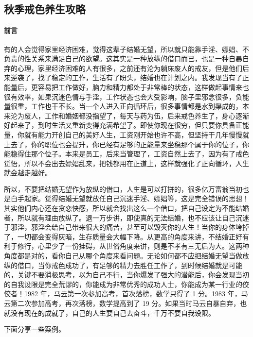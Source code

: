 \subsection{秋季戒色养生攻略}

\paragraph{前言}

有的人会觉得家里经济困难，觉得这辈子结婚无望，所以就只能靠手淫、嫖娼、不负责的性关系来满足自己的欲望。这其实是一种放纵的借口而已，也是一种自暴自弃的心理，家里经济困难的人有很多，之前还有沦为躺床废人的戒友，但是他们后来逆袭了，找了稳定的工作，生活有了盼头，结婚也在计划之内。我发现当有了正能量后，更容易把工作做好，脑力和精力都处于非常棒的状态，这样做起事情来也很有效率，如果沉迷色情与手淫，工作状态也会大受影响，脑子里邪念很多，负能量很重，工作也干不长。当一个人进入正向循环后，很多事情都是水到渠成的，本来沦为废人，工作和婚姻都没指望了，每天与药为伍，后来戒色养生了，身心逐渐好起来了，到时生活又重新变得充满希望了。即使你现在很穷，但只要你具备正能量，你就有能力开创自己的美好人生，工资刚开始也许不高，但坚持干几年慢慢就上去了，你的职位也会提升，你已经有足够的正能量来坐稳那个属于你的位子，你能稳得住那个位子。本来是员工，后来当管理了，工资自然上去了，因为有了戒色觉悟，所以不会出去嫖娼乱来，把钱都用在正道上，这样就强化了正向循环，人生就会越走越好。

所以，不要把结婚无望作为放纵的借口，人生是可以打拼的，很多亿万富翁当初也是白手起家。觉得结婚无望就放任自己沉迷手淫、嫖娼等，这是完全错误的思想！其实他们内心还在贪恋快感，所以就会找出这么一个借口，把自己设定为不能结婚者，所以就有理由放纵了。退一万步讲，即使真的无法结婚，也不应该让自己沉迷于邪淫，邪淫会给自己带来很大的痛苦，甚至可以毁灭你的人生！当你的身体垮掉了，一切都会变得灰暗，生存质量会大幅下降。从更高的角度来讲，不结婚正好有利于修行，心里少了一份挂碍，从世俗角度来讲，则是不孝有三无后为大。这两种角度都是对的，看你自己从哪个角度来看问题。无论如何都不应把结婚无望当做放纵的借口，当你戒色成功了，有足够的精力去胜任工作了，到时候结婚就是可能的，关键不要消极思考，以为自己不行，当你爆发了强大的潜能后，你会发现当初的自我设限是完全荒谬的，你能成为非常优秀的成功人士，你能成为某一行业的佼佼者！1982 年，马云第一次参加高考，首次落榜，数学只得了 1 分。1983 年，马云第二次参加高考，再次落榜，数学提高到了 19 分。如果当时马云自暴自弃，也就没有现在的成就了，自己的人生要自己去奋斗，千万不要自我设限。

下面分享一些案例。

